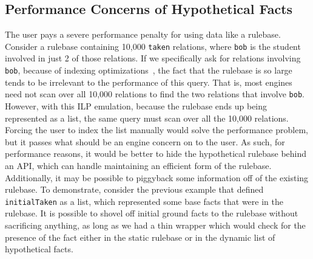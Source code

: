 \subsection{Performance Concerns of Hypothetical Facts}
The user pays a severe performance penalty for using data like a rulebase.
Consider a rulebase containing 10,000 \texttt{taken} relations, where \texttt{bob} is the student involved in just 2 of those relations.
If we specifically ask for relations involving \texttt{bob}, because of indexing optimizations~\cite{Ait-Kaci:1991:WAM:113900, AICPub641:1983}, the fact that the rulebase is so large tends to be irrelevant to the performance of this query.
That is, most engines need not scan over all 10,000 relations to find the two relations that involve \texttt{bob}.
However, with this ILP emulation, because the rulebase ends up being represented as a list, the same query must scan over all the 10,000 relations.
Forcing the user to index the list manually would solve the performance problem, but it passes what should be an engine concern on to the user.
As such, for performance reasons, it would be better to hide the hypothetical rulebase behind an API, which can handle maintaining an efficient form of the rulebase.
Additionally, it may be possible to piggyback some information off of the existing rulebase.
To demonstrate, consider the previous example that defined \texttt{initialTaken} as a list, which represented some base facts that were in the rulebase.
It is possible to shovel off initial ground facts to the rulebase without sacrificing anything, as long as we had a thin wrapper which would check for the presence of the fact either in the static rulebase or in the dynamic list of hypothetical facts.
